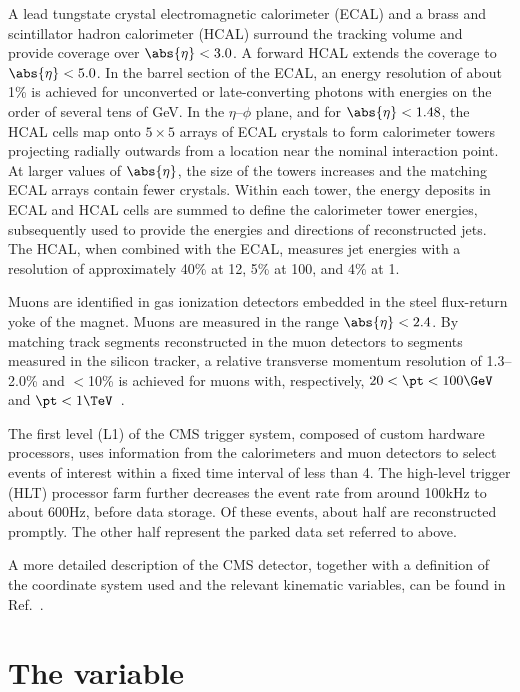 A lead tungstate crystal electromagnetic calorimeter (ECAL) and a
brass and scintillator hadron calorimeter (HCAL) surround the tracking
volume and provide coverage over $\abs{\eta} < 3.0$. A forward HCAL
extends the coverage to $\abs{\eta} < 5.0$. In the barrel section of
the ECAL, an energy resolution of about 1\% is achieved for
unconverted or late-converting photons with energies on the order of
several tens of GeV. In the $\eta$--$\phi$ plane, and for $\abs{\eta}<
1.48$, the HCAL cells map onto $5 \times 5$ arrays of ECAL crystals to
form calorimeter towers projecting radially outwards from a location
near the nominal interaction point. At larger values of $\abs{ \eta
}$, the size of the towers increases and the matching ECAL arrays
contain fewer crystals. Within each tower, the energy deposits in ECAL
and HCAL cells are summed to define the calorimeter tower energies,
subsequently used to provide the energies and directions of
reconstructed jets. The HCAL, when combined with the ECAL, measures
jet energies with a resolution of approximately 40\% at 12\GeV, 5\% at
100\GeV, and 4\% at 1\TeV.

Muons are identified in gas ionization detectors embedded in the steel
flux-return yoke of the magnet. Muons are measured in the range
$\abs{\eta}< 2.4$. By matching track segments reconstructed in the
muon detectors to segments measured in the silicon tracker, a relative
transverse momentum resolution of 1.3--2.0\% and $<$10\% is achieved
for muons with, respectively, $20 <\pt < 100\GeV$ and $\pt <
1\TeV$~\cite{Chatrchyan:2012xi}.

The first level (L1) of the CMS trigger system, composed of custom
hardware processors, uses information from the calorimeters and muon
detectors to select events of interest within a fixed time interval of
less than 4\mus. The high-level trigger (HLT) processor farm further
decreases the event rate from around 100\unit{kHz} to about
600\unit{Hz}, before data storage. Of these events, about half are
reconstructed promptly. The other half represent the parked data set
referred to above.

A more detailed description of the CMS detector, together with a
definition of the coordinate system used and the relevant kinematic
variables, can be found in Ref.~\cite{Chatrchyan:2008zzk}.

\section{The \texorpdfstring{\alphat}{AlphaT} variable\label{sec:alphat}}

